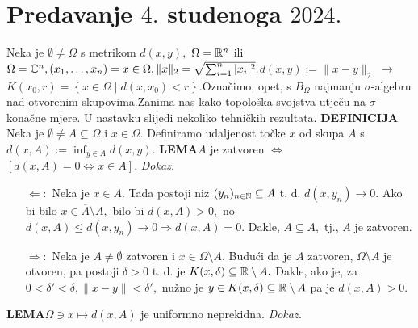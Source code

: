 \documentclass{article}
\begin{document}
\section{Predavanje \(4.\) studenoga \(2024.\)}
Neka je \(\emptyset\ne\Omega\) s metrikom \(d(x,y),\) \(\Omega=\Bbb R^n\) ili \(\Omega=\Bbb C^n,(x_1,\ldots,x_n)=x\in\Omega,\|x\|_2=\sqrt{\sum_{i=1}^n|x_i|^2}.\)\newline \(d(x,y):=\|x-y\|_2\) \(\to\) \(K(x_0,r)=\left\{x\in\Omega\mid d(x,x_0)<r\right\}.\)\newline Označimo, opet, s \(B_\Omega\) najmanju \(\sigma\)-algebru nad otvorenim skupovima.\newline Zanima nas kako topološka svojstva utječu na \(\sigma\)-konačne mjere. U nastavku slijedi nekoliko tehničkih rezultata.\newline\newline
\textbf{DEFINICIJA}\newline
Neka je \(\emptyset\ne A\subseteq\Omega\) i \(x\in\Omega.\) Definiramo udaljenost točke \(x\) od skupa \(A\) s \(\displaystyle d(x,A):=\inf_{y\in A}d(x,y).\)\newline\newline
\textbf{LEMA}\newline \(A\) je zatvoren \(\Leftrightarrow\) \([d(x,A)=0\Leftrightarrow x\in A].\)\newline\newline
\textit{Dokaz.}
\begin{itemize}
    \item[\(\boxed{\Leftarrow}:\)] Neka je \(x\in\overline A.\) Tada postoji niz \((y_n)_{n\in\Bbb N}\subseteq A\) t. d. \(d(x,y_n)\to 0.\) Ako bi bilo \(x\in\overline A\setminus A,\) bilo bi \(d(x,A)>0,\) no \(d(x,A)\le d(x,y_n)\to 0\Rightarrow d(x,A)=0.\) Dakle, \(\overline A\subseteq A,\) tj., \(A\) je zatvoren.
    \item[\(\boxed{\Rightarrow}:\)] Neka je \(A\ne\emptyset\) zatvoren i \(x\in\Omega\setminus A.\) Budući da je \(A\) zatvoren, \(\Omega\setminus A\) je otvoren, pa postoji \(\delta>0\) t. d. je \(K(x,\delta)\subseteq\Bbb R\setminus A.\) Dakle, ako je, za \(0<\delta'<\delta, \|x-y\|<\delta',\) nužno je \(y\in K(x,\delta)\subseteq\Bbb R\setminus A\) pa je \(d(x,A)>0.\) 
\end{itemize}
\textbf{LEMA}\newline \(\Omega\ni x\mapsto d(x,A)\) je uniformno neprekidna.\newline\newline
\textit{Dokaz.}\newline
\end{document}
